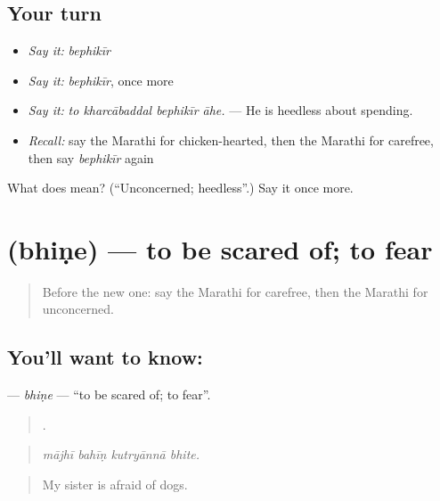 \subsection*{Your turn}
\begin{itemize}
\raggedright
  \item \emph{Say it:} \emph{bephikīr}
  \item \emph{Say it:} \emph{bephikīr}, once more
  \item \emph{Say it:} \emph{to kharcābaddal bephikīr āhe.} — He is heedless about spending.
  \item \emph{Recall:} say the Marathi for chicken-hearted, then the Marathi for carefree, then say \emph{bephikīr} again
\end{itemize}

\begin{tcolorbox}[breakable,colback=teal!4,colframe=teal!35!black,title={Before you move on}]
What does  mean? (\textquotedblleft{}Unconcerned; heedless\textquotedblright{}.) Say it once more.
\end{tcolorbox}
\section[\texorpdfstring{\mr{भिणे} (bhiṇe)}{भिणे (bhiṇe)}]{ (bhiṇe) — to be scared of; to fear}

\label{lesson:MR-C475-bhine}



\begin{quote}
Before the new one: say the Marathi for carefree, then the Marathi for unconcerned.
\end{quote}

\subsection*{You'll want to know: }
\textbf{} — \emph{bhiṇe} — \textquotedblleft{}to be scared of; to fear\textquotedblright{}.

\begin{quote}
   .
\end{quote}

\begin{quote}
\emph{mājhī bahīṇ kutryānnā bhite.}
\end{quote}

\begin{quote}
My sister is afraid of dogs.
\end{quote}

